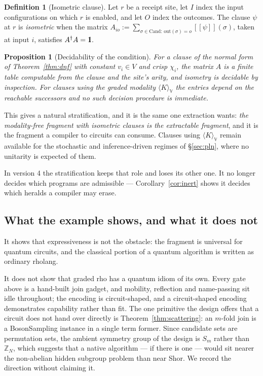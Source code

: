 \documentclass[11pt,a4paper]{article}
\newcommand{\Id}{\mathrm{1}\hspace{-0.30em}\mathrm{l}}
\theoremstyle{plain}
\newtheorem{proposition}[theorem]{Proposition}
\theoremstyle{definition}
\newtheorem{definition}[theorem]{Definition}
\theoremstyle{remark}
\newcommand{\sem}[1]{[\![#1]\!]}
\newcommand{\V}{\mathbb{V}}
\newcommand{\Cand}{\mathrm{Cand}}
\newcommand{\Out}{\mathrm{out}}
\begin{document}
\begin{definition}[Isometric clause]\label{def:isometric}
Let $r$ be a receipt site, let $I$ index the input configurations on which $r$ is
enabled, and let $O$ index the outcomes. The clause $\psi$ at $r$ is
\emph{isometric} when the matrix $A_{io} := \sum_{\sigma \in \Cand:\,
\Out(\sigma)=o} \sem{\psi}(\sigma)$, taken at input $i$, satisfies
$A^{\dagger}A = \Id$.
\end{definition}

\begin{proposition}[Decidability of the condition]\label{prop:decidable}
For a clause of the normal form of Theorem~\ref{thm:dnf} with constant
$v_i \in V$ and crisp $\chi_i$, the matrix $A$ is a finite table computable from
the clause and the site's arity, and isometry is decidable by inspection. For
clauses using the graded modality $\langle K\rangle_\V$ the entries depend on
the reachable successors and no such decision procedure is immediate.
\end{proposition}

This gives a natural stratification, and it is the same one extraction wants:
\emph{the modality-free fragment with isometric clauses is the extractable
fragment}, and it is the fragment a compiler to circuits can consume. Clauses
using $\langle K\rangle_\V$ remain available for the stochastic and
inference-driven regimes of \S\ref{sec:pln}, where no unitarity is expected of
them.

In version 4 the stratification keeps that role and loses its other one. It no
longer decides which programs are admissible --- Corollary~\ref{cor:inert} shows
it decides which heralds a compiler may erase.

\subsection{What the example shows, and what it does not}

It shows that expressiveness is not the obstacle: the fragment is universal for
quantum circuits, and the classical portion of a quantum algorithm is written as
ordinary rholang.

It does not show that graded rho has a quantum idiom of its own. Every gate above
is a hand-built join gadget, and mobility, reflection and name-passing sit idle
throughout; the encoding is circuit-shaped, and a circuit-shaped encoding
demonstrates capability rather than fit. The one primitive the design offers that
a circuit does not hand over directly is Theorem~\ref{thm:scattering}: an
$m$-fold join is a BosonSampling instance in a single term former. Since
candidate sets are permutation sets, the ambient symmetry group of the design is
$S_m$ rather than $\mathbb{Z}_N$, which suggests that a native algorithm --- if
there is one --- would sit nearer the non-abelian hidden subgroup problem than
near Shor. We record the direction without claiming it.
\end{document}
